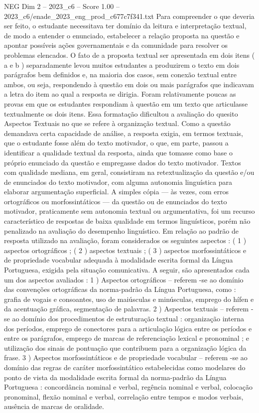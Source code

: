 \begin{textsample}{NEG Dim 2 – 2023\_c6 – Score 1.00 – 2023\_c6/enade\_2023\_eng\_prod\_c677c7f341.txt}
Para compreender o que deveria ser feito, o estudante necessitava ter domínio da leitura e interpretação textual, de modo a entender o enunciado, estabelecer a relação proposta na questão e apontar possíveis ações governamentais e da comunidade para resolver os problemas elencados.
O fato de a proposta textual ser apresentada em dois itens ( a e b ) separadamente levou muitos estudantes a produzirem o texto em dois parágrafos bem definidos e, na maioria dos casos, sem conexão textual entre ambos, ou seja, respondendo à questão em dois ou mais parágrafos que indicavam a letra do item ao qual a resposta se dirigia.
Foram relativamente poucas as provas em que os estudantes respondiam à questão em um texto que articulasse textualmente os dois itens.
Essa formatação dificultou a avaliação do quesito Aspectos Textuais no que se refere à organização textual.
Como a questão demandava certa capacidade de análise, a resposta exigia, em termos textuais, que o estudante fosse além do texto motivador, o que, em parte, passou a identificar a qualidade textual da resposta, ainda que tomasse como base o próprio enunciado da questão e empregasse dados do texto motivador.
Textos com qualidade mediana, em geral, consistiram na retextualização da questão e/ou de enunciados do texto motivador, com alguma autonomia linguística para elaborar argumentação superficial.
A simples cópia — às vezes, com erros ortográficos ou morfossintáticos — da questão ou de enunciados do texto motivador, praticamente sem autonomia textual ou argumentativa, foi um recurso característico de respostas de baixa qualidade em termos linguísticos, porém não penalizado na avaliação do desempenho linguístico.
Em relação ao padrão de resposta utilizado na avaliação, foram considerados os seguintes aspectos : ( 1 ) aspectos ortográficos ; ( 2 ) aspectos textuais ; ( 3 ) aspectos morfossintáticos e de propriedade vocabular adequada à modalidade escrita formal da Língua Portuguesa, exigida pela situação comunicativa.
A seguir, são apresentados cada um dos aspectos avaliados : 1 ) Aspectos ortográficos – referem -se ao domínio das convenções ortográficas da norma-padrão da Língua Portuguesa, como : grafia de vogais e consoantes, uso de maiúsculas e minúsculas, emprego do hífen e da acentuação gráfica, segmentação de palavras. 2 ) Aspectos textuais – referem -se ao domínio dos procedimentos de estruturação textual : organização interna dos períodos, emprego de conectores para a articulação lógica entre os períodos e entre os parágrafos, emprego de marcas de referenciação lexical e pronominal ; e utilização dos sinais de pontuação que contribuem para a organização lógica da frase. 3 ) Aspectos morfossintáticos e de propriedade vocabular – referem -se ao domínio das regras de caráter morfossintático estabelecidas como modelares do ponto de vista da modalidade escrita formal da norma-padrão da Língua Portuguesa : concordância nominal e verbal, regência nominal e verbal, colocação pronominal, flexão nominal e verbal, correlação entre tempos e modos verbais, ausência de marcas de oralidade.

\end{textsample}
